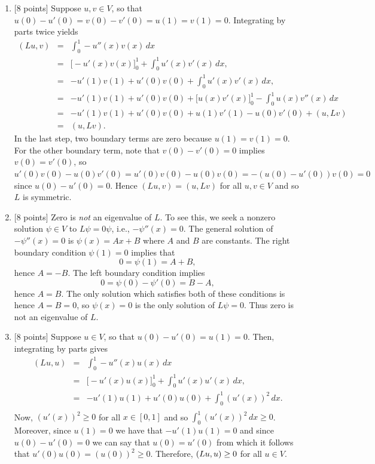 \begin{solution}
\begin{enumerate}
\item {[8 points]} Suppose $u,v \in V$, so that $u(0)-u'(0)=v(0)-v'(0)=u(1)=v(1)=0.$
      Integrating by parts twice yields
\begin{eqnarray*}
 (Lu,v) &=& \int_0^1 -u''(x)v(x) \,dx \\[0.5em]
        &=& \Big[ -u'(x)v(x)\Big]_0^1 + \int_0^1 u'(x)v'(x)\,dx, \\[.5em]
        &=& -u'(1)v(1)+u'(0)v(0) + \int_0^1 u'(x)v'(x)\,dx,\\[.5em]
        &=& -u'(1)v(1)+u'(0)v(0) + \Big[ u(x)v'(x)\Big]_0^1 - \int_0^1 u(x)v''(x)\,dx\\[.5em]
        &=& -u'(1)v(1)+u'(0)v(0) + u(1)v'(1)-u(0)v'(0) + (u,Lv)\\[.5em]
        &=& (u,Lv).
\end{eqnarray*}
In the last step, two boundary terms are zero because $u(1)=v(1)=0$.
For the other boundary term, note that $v(0)-v'(0)=0$ implies $v(0)=v'(0)$,
so $u'(0)v(0) - u(0)v'(0) = u'(0)v(0) - u(0)v(0) = -(u(0)-u'(0))v(0) = 0$
since $u(0)-u'(0)=0$.  Hence $(Lu,v) = (u,Lv)$ for all $u,v \in V$ and so $L$ is symmetric.
\\
\item {[8 points]} Zero is \emph{not} an eigenvalue of $L$.  To see this, 
      we seek a nonzero solution $\psi\in V$ to $L\psi = 0 \psi$, i.e., $-\psi''(x) = 0$.
      The general solution of $-\psi''(x) = 0$ is $\psi(x) = A x + B$ where $A$ and $B$ are constants.
      The right boundary condition $\psi(1)=0$ implies that 
       \[ 0 = \psi(1) = A + B,\]
      hence $A = -B$.  The left boundary condition implies
       \[ 0 = \psi(0) - \psi'(0) = B - A,\]
      hence $A=B$.  The only solution which satisfies both of these conditions is hence
      $A=B=0$, so $\psi(x) = 0$ is the only solution 
      of $L\psi = 0$.
      Thus zero is not an eigenvalue of $L$.
\\
\item {[8 points]} Suppose $u\in V$, so that $u(0)-u'(0)=u(1)=0.$ Then, integrating by parts gives
\begin{eqnarray*}
 (Lu,u) &=& \int_0^1 -u''(x)u(x) \,dx \\[0.5em]
        &=& \Big[ -u'(x)u(x)\Big]_0^1 + \int_0^1  u'(x)u'(x)\,dx, \\[.5em]
        &=& -u'(1)u(1)+u'(0)u(0) + \int_0^1 (u'(x))^2\,dx.\\[.5em]
\end{eqnarray*}
Now, $(u'(x))^2\ge0$ for all $x\in[0,1]$ and so $\int_0^1 (u'(x))^2\,dx\ge0$. Moreover, since  $u(1)=0$ we have that $-u'(1)u(1)=0$ and since $u(0)-u'(0)=0$ we can say that $u(0)=u'(0)$ from which it follows that $u'(0)u(0)=(u(0))^2\ge0$. Therefore, $(Lu,u)\ge0$ for all $u\in V$.


\end{enumerate}
\end{solution}
